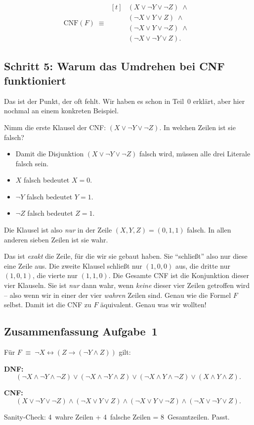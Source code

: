 \documentclass[a4paper,12pt]{article}
\begin{document}
\begin{merkbox}[title={Ergebnis: CNF}]
\[
\text{CNF}(F) \;\equiv\; \begin{aligned}[t]
  &(X \vee \neg Y \vee \neg Z) \;\wedge\; \\
  &(\neg X \vee Y \vee Z) \;\wedge\; \\
  &(\neg X \vee Y \vee \neg Z) \;\wedge\; \\
  &(\neg X \vee \neg Y \vee Z).
\end{aligned}
\]
\end{merkbox}

\subsection*{Schritt 5: Warum das Umdrehen bei CNF funktioniert}

Das ist der Punkt, der oft fehlt. Wir haben es schon in Teil~0
erkl\"art, aber hier nochmal an einem konkreten Beispiel.

Nimm die erste Klausel der CNF: $(X \vee \neg Y \vee \neg Z)$. In
welchen Zeilen ist sie falsch?
\begin{itemize}[nosep]
\item Damit die Disjunktion $(X \vee \neg Y \vee \neg Z)$ falsch wird,
      m\"ussen alle drei Literale falsch sein.
\item $X$ falsch bedeutet $X = 0$.
\item $\neg Y$ falsch bedeutet $Y = 1$.
\item $\neg Z$ falsch bedeutet $Z = 1$.
\end{itemize}
Die Klausel ist also \emph{nur} in der Zeile $(X,Y,Z) = (0,1,1)$
falsch. In allen anderen sieben Zeilen ist sie wahr.

Das ist \emph{exakt} die Zeile, f\"ur die wir sie gebaut haben. Sie
"`schlie{\ss}t"' also nur diese eine Zeile aus. Die zweite Klausel
schlie{\ss}t nur $(1,0,0)$ aus, die dritte nur $(1,0,1)$, die vierte
nur $(1,1,0)$. Die Gesamte CNF ist die Konjunktion dieser vier
Klauseln. Sie ist \emph{nur} dann wahr, wenn \emph{keine} dieser vier
Zeilen getroffen wird -- also wenn wir in einer der vier
\emph{wahren} Zeilen sind. Genau wie die Formel $F$ selbst. Damit ist
die CNF zu $F$ \"aquivalent. Genau was wir wollten!

\subsection*{Zusammenfassung Aufgabe~1}

\begin{merkbox}[title={Ergebnis Aufgabe~1}]
F\"ur $F \;\equiv\; \neg X \leftrightarrow (Z \to (\neg Y \wedge Z))$
gilt:

\medskip
\textbf{DNF:}
\[
(\neg X \wedge \neg Y \wedge \neg Z)
 \vee (\neg X \wedge \neg Y \wedge Z)
 \vee (\neg X \wedge Y \wedge \neg Z)
 \vee (X \wedge Y \wedge Z).
\]

\textbf{CNF:}
\[
(X \vee \neg Y \vee \neg Z)
 \wedge (\neg X \vee Y \vee Z)
 \wedge (\neg X \vee Y \vee \neg Z)
 \wedge (\neg X \vee \neg Y \vee Z).
\]

\medskip
Sanity-Check: 4~wahre Zeilen + 4~falsche Zeilen = 8~Gesamtzeilen.
Passt.
\end{merkbox}
\end{document}
